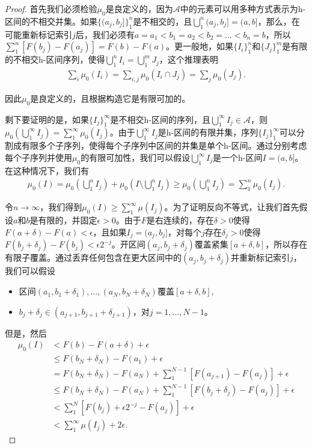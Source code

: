 \documentclass[lang=cn,10pt,thmcnt=section]{elegantbook}
\begin{document}
	\begin{proof}
	首先我们必须检验$\mu_0$是良定义的，因为$\mathcal{A}$中的元素可以用多种方式表示为h-区间的不相交并集。如果$\{(a_j, b_j]\}_{1}^{n}$是不相交的，且$\bigcup_{1}^{n}(a_j, b_j] = (a, b]$，那么，在可能重新标记索引$j$后，我们必须有$a = a_1 < b_1 = a_2 < b_2 = \ldots < b_n = b$，所以$\sum_{1}^{n}[F(b_j) - F(a_j)] = F(b) - F(a)$。更一般地，如果$\{I_i\}_{1}^{n}$和$\{J_j\}_{1}^{m}$是有限的不相交h-区间序列，使得$\bigcup_{1}^{n} I_i = \bigcup_{1}^{m} J_j$，这个推理表明
	\begin{align}
	\sum_{i} \mu_0(I_i) = \sum_{i,j} \mu_0(I_i \cap J_j) = \sum_{j} \mu_0(J_j).
	\end{align}
	
	因此$\mu_0$是良定义的，且根据构造它是有限可加的。
	
	剩下要证明的是，如果$\{I_j\}_{1}^{\infty}$是不相交h-区间的序列，且$\bigcup_{1}^{\infty} I_j \in \mathcal{A}$，则$\mu_0(\bigcup_{1}^{\infty} I_j) = \sum_{1}^{\infty} \mu_0(I_j)$。由于$\bigcup_{1}^{\infty} I_j$是h-区间的有限并集，序列$\{I_j\}_{1}^{\infty}$可以分割成有限多个子序列，使得每个子序列中区间的并集是单个h-区间。通过分别考虑每个子序列并使用$\mu_0$的有限可加性，我们可以假设$\bigcup_{1}^{\infty} I_j$是一个h-区间$I = (a, b]$。在这种情况下，我们有
	\begin{align}
	\mu_0(I) = \mu_0\left(\bigcup_{1}^{n} I_j\right) + \mu_0\left(I \setminus \bigcup_{1}^{n} I_j\right) \geq \mu_0\left(\bigcup_{1}^{n} I_j\right) = \sum_{1}^{n} \mu_0(I_j).
	\end{align}
	
	令$n \to \infty$，我们得到$\mu_0(I) \geq \sum_{1}^{\infty} \mu(I_j)$。为了证明反向不等式，让我们首先假设$a$和$b$是有限的，并固定$\epsilon > 0$。由于$F$是右连续的，存在$\delta > 0$使得$F(a + \delta) - F(a) < \epsilon$，且如果$I_j = (a_j, b_j]$，对每个$j$存在$\delta_j > 0$使得$F(b_j + \delta_j) - F(b_j) < \epsilon 2^{-j}$。开区间$(a_j, b_j + \delta_j)$覆盖紧集$[a + \delta, b]$，所以存在有限子覆盖。通过丢弃任何包含在更大区间中的$(a_j, b_j + \delta_j)$并重新标记索引$j$，我们可以假设
	\begin{itemize}
	\item 区间$(a_1, b_1 + \delta_1), \ldots, (a_N, b_N + \delta_N)$覆盖$[a + \delta, b]$,
	\item $b_j + \delta_j \in (a_{j+1}, b_{j+1} + \delta_{j+1})$，对$j = 1, \ldots, N - 1$。
	\end{itemize}
	
	但是，然后
	\begin{align}
	\mu_0(I) &< F(b) - F(a + \delta) + \epsilon\\
	&\leq F(b_N + \delta_N) - F(a_1) + \epsilon\\
	&= F(b_N + \delta_N) - F(a_N) + \sum_{1}^{N-1}[F(a_{j+1}) - F(a_j)] + \epsilon\\
	&\leq F(b_N + \delta_N) - F(a_N) + \sum_{1}^{N-1}[F(b_j + \delta_j) - F(a_j)] + \epsilon\\
	&< \sum_{1}^{N}[F(b_j) + \epsilon 2^{-j} - F(a_j)] + \epsilon\\
	&< \sum_{1}^{\infty} \mu(I_j) + 2\epsilon.
	\end{align}
	

\end{proof}
\end{document}
